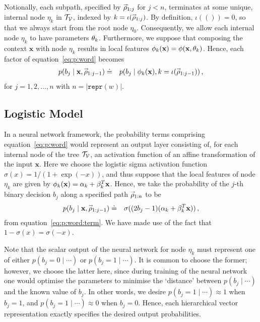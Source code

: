 \documentclass[a4paper]{article}
\newcommand{\rvec}[1]{\accentset{\rightarrow}{#1}}
\begin{document}
Notionally, each subpath, specified by $\rvec{\rho}_{1:j}$ for $j<n$,
terminates at some unique, internal node $\eta_k$ in ${\cal T}_{\cal V}$, indexed by
$k=\iota(\rvec{\rho}_{1:j})$. By definition, $\iota(())=0$, so that we always start from the root node $\eta_0$.
Consequently, we allow each internal node $\eta_k$ to have parameters ${\bf\theta}_k$.
Furthermore, we suppose that composing the context $\textbf{x}$ with node $\eta_k$
results in local features ${\bf\phi}_k({\bf x})={\bf\phi}({\bf x},{\bf\theta}_k)$.
Hence, each factor of equation~\eqref{eq:p:word} becomes
\begin{eqnarray}
p(b_j\;|\;\textbf{x},\rvec{\rho}_{1:j-1}) & \doteq &
p(b_j\;|\;{\bf\phi}_{k}({\bf x}),k=\iota(\rvec{\rho}_{1:j-1}))
\,,
\label{eq:p:word:term}
\end{eqnarray}
for $j=1,2,\ldots,n$ with $n=|\texttt{repr}(w)|$.

\subsection{Logistic Model}

In a neural network framework, the probability terms comprising equation~\eqref{eq:p:word} would represent an output layer
consisting of, for each internal node of the tree ${\cal T}_{\cal V}$, an activation function of an affine transformation of the input $\textbf{x}$.
Here we choose the logistic sigma activation function $\sigma(x)=1/(1+\exp{(-x)})$, and thus suppose that the local features of node $\eta_k$
are given by ${\bf\phi}_k({\bf x})=\alpha_k + {\bf \beta}_k^{T}{\bf x}$.
Hence, we take the probability of the $j$-th binary decision $b_j$ along a specified path $\rvec{\rho}_{1:n}$ to be
\begin{eqnarray}
p(b_j\;|\;{\bf x},\rvec{\rho}_{1:j-1}) & \doteq & \sigma((2b_j-1)(\alpha_k+{\bf \beta}_k^{T}{\bf x}))\,,
\end{eqnarray}
from equation~\eqref{eq:p:word:term}. We have made use of the fact that $1-\sigma(x)=\sigma(-x)$.

Note that the scalar output of the neural network for node $\eta_k$ must represent one of either $p(b_j=0\;|\;\cdots)$ or
$p(b_j=1\;|\;\cdots)$. It is common to choose the former; however, we choose the latter here, since during training of the neural network
one would optimise the parameters to minimise the `distance' between $p(b_j\;|\;\cdots)$ and the known value of $b_j$.
In other words, we desire $p(b_j=1\;|\;\cdots)\approx 1$ when $b_j=1$, and $p(b_j=1\;|\;\cdots)\approx 0$ when $b_j=0$.
Hence, each hierarchical vector representation exactly specifies the desired output probabilities.
\end{document}
